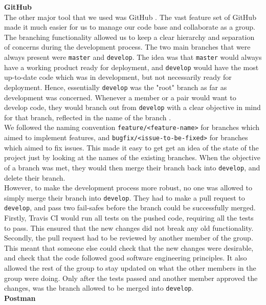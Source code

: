 \documentclass[titlepage,11pt]{article}
\begin{document}
\textbf{GitHub} \\

The other major tool that we used was GitHub \cite{github}. The vast feature set of GitHub made it much easier for us to manage our code base and collaborate as a group. The branching functionality allowed us to keep a clear hierarchy and separation of concerns during the development process. The two main branches that were always present were \texttt{master} and \texttt{develop}. The idea was that \texttt{master} would always have a working product ready for deployment, and \texttt{develop} would have the most up-to-date code which was in development, but not necessarily ready for deployment. Hence, essentially \texttt{develop} was the "root" branch as far as development was concerned. Whenever a member or a pair would want to develop code, they would branch out from \texttt{develop} with a clear objective in mind for that branch, reflected in the name of the branch \cite{vincentdriessen2010}. \\

We followed the naming convention \texttt{feature/<feature-name>} for branches which aimed to implement features, and \texttt{bugfix/<issue-to-be-fixed>} for branches which aimed to fix issues. This made it easy to get get an idea of the state of the project just by looking at the names of the existing branches. When the objective of a branch was met, they would then merge their branch back into \texttt{develop}, and delete their branch. \\

However, to make the development process more robust, no one was allowed to simply merge their branch into \texttt{develop}. They had to make a pull request to \texttt{develop}, and pass two fail-safes before the branch could be successfully merged. Firstly, Travis CI would run all tests on the pushed code, requiring all the tests to pass. This ensured that the new changes did not break any old functionality. Secondly, the pull request had to be reviewed by another member of the group. This meant that someone else could check that the new changes were desirable, and check that the code followed good software engineering principles. It also allowed the rest of the group to stay updated on what the other members in the group were doing. Only after the tests passed and another member approved the changes, was the branch allowed to be merged into \texttt{develop}. \\

\textbf{Postman} \\
\end{document}
